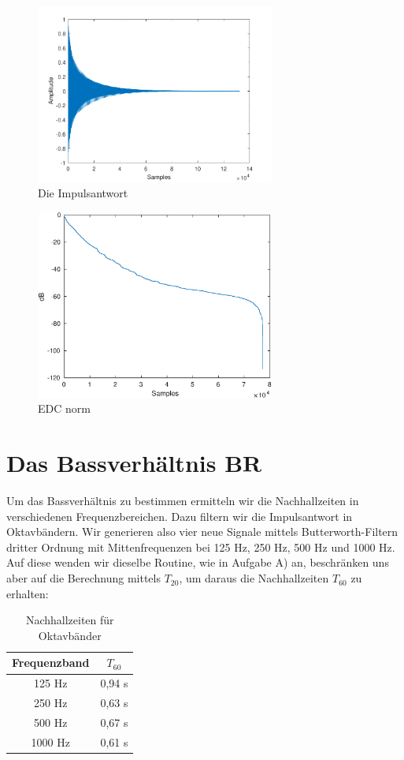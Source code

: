 \begin{figure}[H]
    \center
    \includegraphics[width = 0.7\textwidth]{figures/samples}
    \caption{Die Impulsantwort}
    \label{fig:im}
\end{figure}

\begin{figure}[H]
    \center
    \includegraphics[width = 0.7\textwidth]{figures/EDC_norm.eps}
    \caption{EDC norm}
    \label{fig:edc}
\end{figure}

\section{Das Bassverhältnis $\mathbf{BR}$}
\label{sec:br}
Um das Bassverhältnis zu bestimmen ermitteln wir die Nachhallzeiten in verschiedenen Frequenzbereichen. Dazu filtern wir die Impulsantwort in Oktavbändern.
Wir generieren also vier neue Signale mittels Butterworth-Filtern dritter Ordnung mit Mittenfrequenzen bei 125 Hz, 250 Hz, 500 Hz und 1000 Hz. Auf diese wenden wir dieselbe Routine, wie in Aufgabe A) an, beschränken uns aber auf die Berechnung mittels $T_{20}$, um daraus die Nachhallzeiten $T_{60}$ zu erhalten:
\begin{table}[H]
\centering
\caption{Nachhallzeiten für Oktavbänder}
\label{tab:T_band}
\begin{tabular}{ | c | c |}
\hline
  Frequenzband & $T_{60}$ \\
  \hline
  125 Hz &  0,94 s \\
  250 Hz & 0,63 s \\
  500 Hz & 0,67 s \\
  1000 Hz & 0,61 s  \\
  \hline
  \end{tabular}
\end{table}

